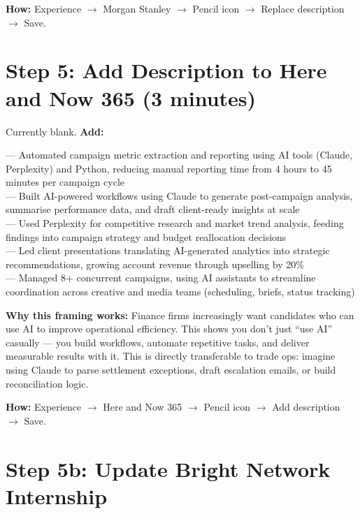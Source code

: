 \documentclass[11pt,a4paper]{article}
\begin{document}
\textbf{How:} Experience $\rightarrow$ Morgan Stanley $\rightarrow$ Pencil icon $\rightarrow$ Replace description $\rightarrow$ Save.

\section{Step 5: Add Description to Here and Now 365 (3 minutes)}

Currently blank. \textbf{Add:}

\begin{copybox}
--- Automated campaign metric extraction and reporting using AI tools (Claude, Perplexity) and Python, reducing manual reporting time from 4 hours to 45 minutes per campaign cycle\\
--- Built AI-powered workflows using Claude to generate post-campaign analysis, summarise performance data, and draft client-ready insights at scale\\
--- Used Perplexity for competitive research and market trend analysis, feeding findings into campaign strategy and budget reallocation decisions\\
--- Led client presentations translating AI-generated analytics into strategic recommendations, growing account revenue through upselling by 20\%\\
--- Managed 8+ concurrent campaigns, using AI assistants to streamline coordination across creative and media teams (scheduling, briefs, status tracking)
\end{copybox}

{\small\textbf{Why this framing works:} Finance firms increasingly want candidates who can use AI to improve operational efficiency. This shows you don't just ``use AI'' casually --- you build workflows, automate repetitive tasks, and deliver measurable results with it. This is directly transferable to trade ops: imagine using Claude to parse settlement exceptions, draft escalation emails, or build reconciliation logic.}

\textbf{How:} Experience $\rightarrow$ Here and Now 365 $\rightarrow$ Pencil icon $\rightarrow$ Add description $\rightarrow$ Save.

\section{Step 5b: Update Bright Network Internship}
\end{document}
